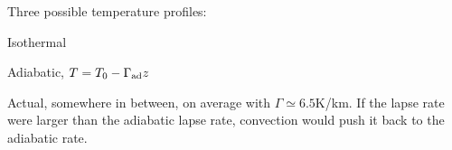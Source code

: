 \documentclass[11pt]{book}
\begin{document}
Three possible temperature profiles:
\bee
\item Isothermal
\item Adiabatic, $T=T_0-\Gamma_{\rm ad} z$
\item Actual, somewhere in between, on average with $\Gamma\simeq 6.5$K/km. If the lapse rate were larger than the adiabatic lapse rate, convection would push it back to the adiabatic rate.  %
\eee


%
%
%
%
%





\end{document}
